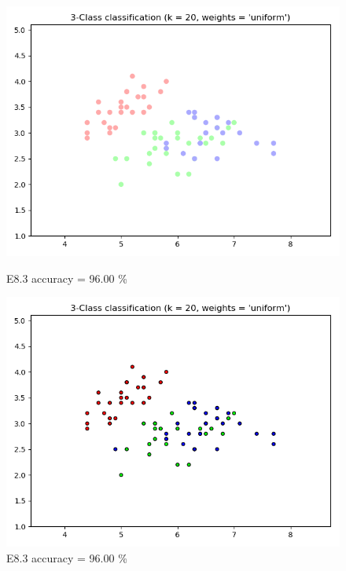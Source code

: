 \documentclass{classrep}
\begin{document}
\begin{figure}[H]
\begin{minipage}{0.5\linewidth}
				\includegraphics[scale=0.25]{KNN_iris_8_5.png}
				\caption{E8.3 accuracy = 96.00 \%}
				\label{E8.3}
			\end{minipage}
			\begin{minipage}{0.5\linewidth}
				\centering
				\includegraphics[scale=0.25]{KNN_iris_8_6.png}
				\caption{E8.3 accuracy = 96.00 \%}
				\label{E8.3}
			\end{minipage}
			\begin{minipage}{0.5\linewidth}
				\centering

\end{minipage}
\end{figure}
\end{document}

